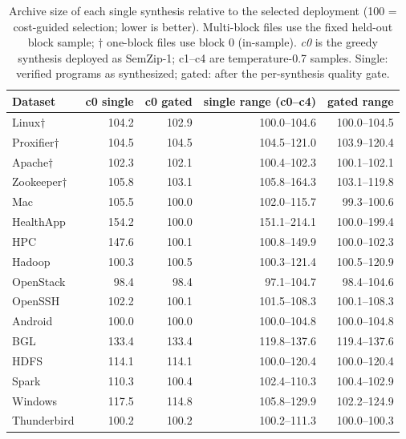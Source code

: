 \begin{table}[t]\centering\small
\caption{Archive size of each single synthesis relative to the selected deployment (100 = cost-guided selection; lower is better). Multi-block files use the fixed held-out block sample; $\dagger$ one-block files use block 0 (in-sample). \emph{c0} is the greedy synthesis deployed as SemZip-1; c1--c4 are temperature-0.7 samples. Single: verified programs as synthesized; gated: after the per-synthesis quality gate.}
\label{tab:stability}
\begin{tabular}{lrrrr}
\toprule
Dataset & c0 single & c0 gated & single range (c0--c4) & gated range \\
\midrule
Linux$\dagger$ & 104.2 & 102.9 & 100.0--104.6 & 100.0--104.5 \\
Proxifier$\dagger$ & 104.5 & 104.5 & 104.5--121.0 & 103.9--120.4 \\
Apache$\dagger$ & 102.3 & 102.1 & 100.4--102.3 & 100.1--102.1 \\
Zookeeper$\dagger$ & 105.8 & 103.1 & 105.8--164.3 & 103.1--119.8 \\
Mac & 105.5 & 100.0 & 102.0--115.7 & 99.3--100.6 \\
HealthApp & 154.2 & 100.0 & 151.1--214.1 & 100.0--199.4 \\
HPC & 147.6 & 100.1 & 100.8--149.9 & 100.0--102.3 \\
Hadoop & 100.3 & 100.5 & 100.3--121.4 & 100.5--120.9 \\
OpenStack & 98.4 & 98.4 & 97.1--104.7 & 98.4--104.6 \\
OpenSSH & 102.2 & 100.1 & 101.5--108.3 & 100.1--108.3 \\
Android & 100.0 & 100.0 & 100.0--104.8 & 100.0--104.8 \\
BGL & 133.4 & 133.4 & 119.8--137.6 & 119.4--137.6 \\
HDFS & 114.1 & 114.1 & 100.0--120.4 & 100.0--120.4 \\
Spark & 110.3 & 100.4 & 102.4--110.3 & 100.4--102.9 \\
Windows & 117.5 & 114.8 & 105.8--129.9 & 102.2--124.9 \\
Thunderbird & 100.2 & 100.2 & 100.2--111.3 & 100.0--100.3 \\
\bottomrule
\end{tabular}\end{table}
